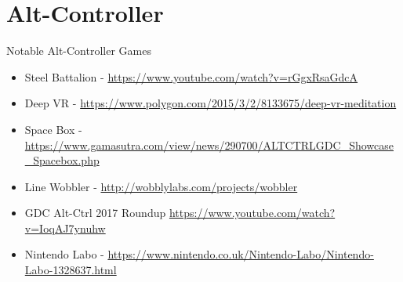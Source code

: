 \part{Alt-Controller}
\frame{\partpage}

\begin{frame}{Notable Alt-Controller Games}
\begin{itemize}
	\item Steel Battalion - \url{https://www.youtube.com/watch?v=rGgxRsaGdcA}
	\item Deep VR - \url{https://www.polygon.com/2015/3/2/8133675/deep-vr-meditation}
	\item Space Box - \url{https://www.gamasutra.com/view/news/290700/ALTCTRLGDC_Showcase_Spacebox.php}
	\item Line Wobbler - \url{http://wobblylabs.com/projects/wobbler}
	\item GDC Alt-Ctrl 2017 Roundup \url{https://www.youtube.com/watch?v=IoqAJ7ynuhw}
	\item Nintendo Labo - \url{https://www.nintendo.co.uk/Nintendo-Labo/Nintendo-Labo-1328637.html}
\end{itemize}
\end{frame}

